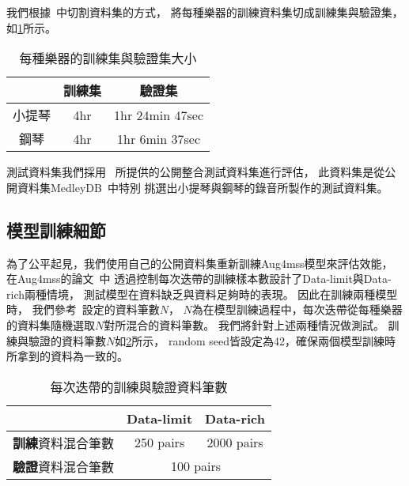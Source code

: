 \documentclass[class=NCU_thesis, crop=false]{standalone}
\begin{document}
我們根據~\cite{Chiu_ChingYu2020MixingSpecific}中切割資料集的方式，
將每種樂器的訓練資料集切成訓練集與驗證集，如\cref{table:table-ours-splited-dataset}所示。
\begin{table}[h]
    \centering
    \caption{每種樂器的訓練集與驗證集大小}
    \label{table:table-ours-splited-dataset}
    \begin{tabular}{|c|c|c|}
        \hline
        \multicolumn{1}{|c|}{} & \multicolumn{1}{|c|}{訓練集} & \multicolumn{1}{|c|}{驗證集} \\
        \hline
        小提琴 & 4hr & 1hr 24min 47sec \\
        \hline
        鋼琴 & 4hr & 1hr 6min 37sec \\
        \hline
    \end{tabular}
\end{table}

測試資料集我們採用~\cite{Chiu_ChingYu2020MixingSpecific}
所提供的公開整合測試資料集進行評估，
此資料集是從公開資料集MedleyDB~\cite{Bittner2014MedleyDB}中特別
挑選出小提琴與鋼琴的錄音所製作的測試資料集。


\subsection{模型訓練細節} \label{training-dataset-processing}
為了公平起見，我們使用自己的公開資料集重新訓練Aug4mss模型來評估效能，
在Aug4mss的論文~\cite{Chiu_ChingYu2020MixingSpecific}中
透過控制每次迭帶的訓練樣本數設計了Data-limit與Data-rich兩種情境，
測試模型在資料缺乏與資料足夠時的表現。
因此在訓練兩種模型時，
我們參考~\cite{Chiu_ChingYu2020MixingSpecific}設定的資料筆數$N$，
$N$為在模型訓練過程中，每次迭帶從每種樂器的資料集隨機選取$N$對所混合的資料筆數。
我們將針對上述兩種情況做測試。
訓練與驗證的資料筆數$N$如\cref{table:table-training-dataset-split}所示，
random seed皆設定為42，確保兩個模型訓練時所拿到的資料為一致的。
\begin{table}[h]
    \centering
    \caption{每次迭帶的訓練與驗證資料筆數}
    \label{table:table-training-dataset-split}
    \begin{tabular}{|c|c|c|}
        \hline
        \multicolumn{1}{|c|}{} & \multicolumn{1}{|c|}{Data-limit} & \multicolumn{1}{|c|}{Data-rich} \\
        \hline
        \textbf{訓練}資料混合筆數 & 250 pairs & 2000 pairs \\
        \hline
        \textbf{驗證}資料混合筆數 & \multicolumn{2}{|c|}{100 pairs} \\
        \hline
    \end{tabular}
\end{table}
\end{document}
